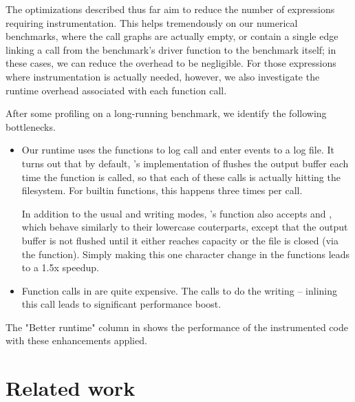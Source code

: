 The optimizations described thus far aim to reduce the number of expressions
requiring instrumentation. This helps tremendously on our numerical benchmarks,
where the call graphs are actually empty, or contain a single edge linking a
call from the benchmark's driver function to the benchmark itself; in these
cases, we can reduce the overhead to be negligible. For those expressions
where instrumentation is actually needed, however, we also investigate the
runtime overhead associated with each function call.

After some profiling on a long-running benchmark, we identify the following
bottlenecks.

\begin{itemize}

  \item Our runtime uses the  functions to log call and enter
    events to a log file. It turns out that by default, \matlab's
    implementation of  flushes the output buffer each time the
    function is called, so that each of these calls is actually hitting the
    filesystem. For builtin functions, this happens three times per call.

    In addition to the usual  and  writing modes,
    \matlab's  function also accepts  and ,
    which behave similarly to their lowercase couterparts, except that the
    output buffer is not flushed until it either reaches capacity or the file
    is closed (via the  function). Simply making this one
    character change in the  functions leads to
    a 1.5x speedup.

  \item Function calls in \matlab are quite expensive. The
     calls 
    to do the writing -- inlining this call leads to significant performance
    boost.

\end{itemize}

The "Better runtime" column in  shows the
performance of the instrumented code with these enhancements applied.

\section{Related work}
